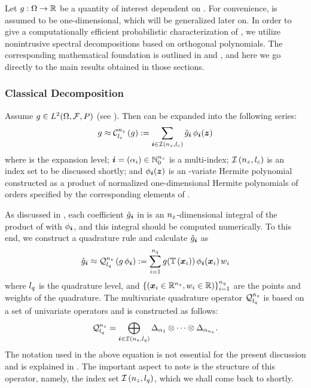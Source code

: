 Let $g: \Omega \to \mathbb{R}$ be a quantity of interest dependent on \vu. For
convenience, \g is assumed to be one-dimensional, which will be generalized
later on. In order to give a computationally efficient probabilistic
characterization of \g, we utilize nonintrusive spectral decompositions based on
orthogonal polynomials. The corresponding mathematical foundation is outlined in
 and , and here we go
directly to the main results obtained in those sections.

\subsubsection{Classical Decomposition}

Assume $\g \in \L{2}(\Omega, \mathcal{F}, \probability)$ (see
). Then \g can be expanded into the following series:
\[
  \g \approx \chaos{\nz}{\lc}{\g} := \sum_{\multiindex \in
  \multiindices{\nz}{\lc}} \hat{\g}_{\multiindex} \, \phi_{\multiindex}(\vz)
\]
where \lc is the expansion level; $\boldsymbol{i} = (\alpha_i) \in \mathbb{N}_0^{n_{z}}$ is
a multi-index; $\mathcal{I}\left({n_{z}}, {l_{c}}\right)$ is an index set to be discussed
shortly; and $\phi_{\boldsymbol{i}}(\boldsymbol{z})$ is an \nz-variate Hermite polynomial
constructed as a product of normalized one-dimensional Hermite polynomials of
orders specified by the corresponding elements of \multiindex.

As discussed in , each coefficient
$\hat{g}_{\boldsymbol{i}}$ in  is an
${n_{z}}$-dimensional integral of the product of \g with $\phi_{\boldsymbol{i}}$, and
this integral should be computed numerically. To this end, we construct a
quadrature rule and calculate $\hat{g}_{\boldsymbol{i}}$ as
\begin{equation} \elab{numerical-integration}
  \hat{\g}_{\multiindex} \approx \quadrature{\nz}{\lq}{\g \,
  \phi_{\multiindex}} := \sum_{i = 1}^\nq \g(\transform{\v{x}_i}) \, \phi_{\multiindex}(\v{x}_i) \, w_i
\end{equation}
where ${l_{q}}$ is the quadrature level, and $\{ (\boldsymbol{x}_i \in \mathbb{R}^{n_{z}}, w_i \in
\mathbb{R}) \}_{i = 1}^{n_{q}}$ are the points and weights of the quadrature. The
multivariate quadrature operator $\quadrature{\nz}{\lq}$ is based on a set of
univariate operators and is constructed as follows:
\begin{equation} \elab{smolyak-sparse-grid}
  \quadrature{\nz}{\lq} = \bigoplus_{\multiindex \in \multiindices{\nz}{\lq}}
  \Delta_{\alpha_1} \otimes \cdots \otimes \Delta_{\alpha_\nz}.
\end{equation}
The notation used in the above equation is not essential for the present
discussion and is explained in . The important
aspect to note is the structure of this operator, namely, the index set
$\mathcal{I}\left({n_{z}}, {l_{q}}\right)$, which we shall come back to shortly.

